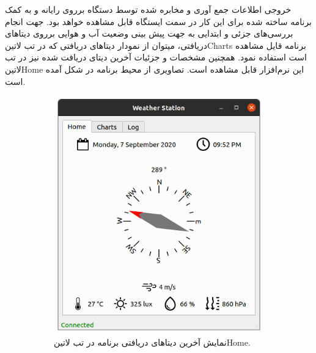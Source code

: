خروجی اطلاعات جمع آوری و مخابره شده توسط دستگاه برروی رایانه و به کمک برنامه ساخته شده برای این کار در سمت ایستگاه قابل مشاهده خواهد بود. جهت انجام بررسی‌های جزئی و ابتدایی به جهت پیش بینی وضعیت آب و هوایی برروی دیتا‌های دریافتی، میتوان از نمودار‌ دیتا‌های دریافتی که در تب ‌لاتین{Charts} برنامه قایل مشاهده است استفاده نمود. همچنین مشخصات و جزئیات آخرین دیتای دریافت شده نیز در تب ‌لاتین{Home} این نرم‌افزار قابل مشاهده است. تصاویری از محیط برنامه در  شکل  آمده است.
\begin{figure}[!h]
	\begin{subfigure}[b]{0.5\textwidth}
		\includegraphics[width=\linewidth]{Assets/desktopAppHome.png}
		\caption{نمایش آخرین دیتا‌های دریافتی برنامه در تب ‌لاتین{Home}.}
		\label{fig:desktopAppHome}
	\end{subfigure}
	\begin{subfigure}[b]{0.5\textwidth}

\end{subfigure}
\end{figure}
